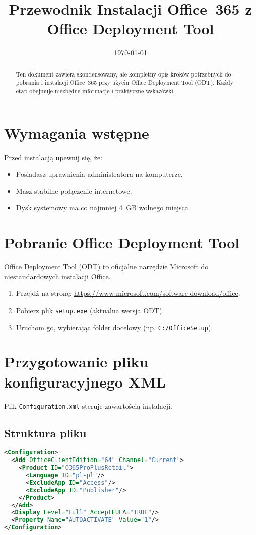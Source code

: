 \documentclass[a4paper,12pt]{article}
\title{Przewodnik Instalacji Office~365 z Office Deployment Tool}
\author{}
\date{\today}
\begin{document}
\maketitle

\begin{abstract}
Ten dokument zawiera skondensowany, ale kompletny opis kroków potrzebnych do pobrania i instalacji Office~365 przy użyciu Office Deployment Tool (ODT). Każdy etap obejmuje niezbędne informacje i praktyczne wskazówki.
\end{abstract}

\tableofcontents
\newpage

\section{Wymagania wstępne}
Przed instalacją upewnij się, że:
\begin{itemize}
  \item Posiadasz uprawnienia administratora na komputerze.
  \item Masz stabilne połączenie internetowe.
  \item Dysk systemowy ma co najmniej 4~GB wolnego miejsca.
\end{itemize}

\section{Pobranie Office Deployment Tool}
Office Deployment Tool (ODT) to oficjalne narzędzie Microsoft do niestandardowych instalacji Office.
\begin{enumerate}
  \item Przejdź na stronę: \url{https://www.microsoft.com/software-download/office}.
  \item Pobierz plik \texttt{setup.exe} (aktualna wersja ODT).
  \item Uruchom go, wybierając folder docelowy (np. \texttt{C:/OfficeSetup}).
\end{enumerate}

\section{Przygotowanie pliku konfiguracyjnego XML}
Plik \texttt{Configuration.xml} steruje zawartością instalacji.
\subsection{Struktura pliku}
\begin{lstlisting}[language=XML]
<Configuration>
  <Add OfficeClientEdition="64" Channel="Current">
    <Product ID="O365ProPlusRetail">
      <Language ID="pl-pl"/>
      <ExcludeApp ID="Access"/>
      <ExcludeApp ID="Publisher"/>
    </Product>
  </Add>
  <Display Level="Full" AcceptEULA="TRUE"/>
  <Property Name="AUTOACTIVATE" Value="1"/>
</Configuration>
\end{lstlisting}
\end{document}

